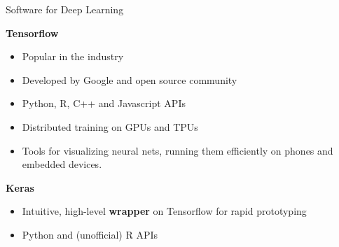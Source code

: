 \begin{frame} {Software for Deep Learning}
  \begin{figure}
    \centering
  \end{figure}
\textbf{Tensorflow}
\begin{itemize}
  \item Popular in the industry
  \item Developed by Google and \newline open source community
  \item Python, R, C++ and Javascript APIs
  \item Distributed training on GPUs and TPUs
  \item Tools for visualizing neural nets, running them efficiently on phones and embedded devices.
\end{itemize}

\begin{figure}
  \centering
\end{figure}

\textbf{Keras}
  \begin{itemize}
    \item Intuitive, high-level \textbf{wrapper} on Tensorflow for rapid prototyping
    \item Python and (unofficial) R APIs
    
  \end{itemize}
\end{frame}

